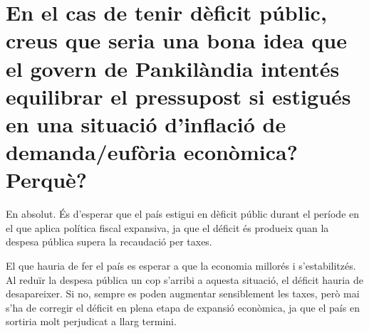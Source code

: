 \section{En el cas de tenir dèficit públic, creus que seria una bona idea que el govern
de Pankilàndia intentés equilibrar el pressupost si estigués en una situació
d’inflació de demanda/eufòria econòmica? Perquè?}

En absolut. És d'esperar que el país estigui en dèficit públic durant el
període en el que aplica política fiscal expansiva, ja que el déficit
és produeix quan la despesa pública supera la recaudació per taxes.

El que hauria de fer el país es esperar a que la economia millorés i
s'estabilitzés. Al reduïr la despesa pública un cop s'arribi a aquesta
situació, el déficit hauria de desapareixer. Si no, sempre es poden
augmentar sensiblement les taxes, però mai s'ha de corregir el déficit
en plena etapa de expansió econòmica, ja que el país en sortiria molt
perjudicat a llarg termini.
